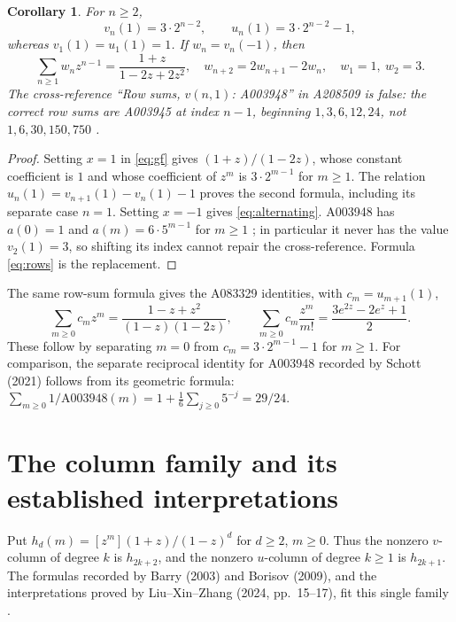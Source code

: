 \documentclass[11pt]{article}
\newtheorem{corollary}[theorem]{Corollary}
\begin{document}
\begin{corollary}\label{cor:rows}
For $n\geq2$,
\begin{equation}\label{eq:rows}
v_n(1)=3\cdot2^{n-2},\qquad u_n(1)=3\cdot2^{n-2}-1,
\end{equation}
whereas $v_1(1)=u_1(1)=1$. If $w_n=v_n(-1)$, then
\begin{equation}\label{eq:alternating}
\sum_{n\geq1}w_nz^{n-1}=\frac{1+z}{1-2z+2z^2},\quad
w_{n+2}=2w_{n+1}-2w_n,\quad w_1=1,\ w_2=3.
\end{equation}
The cross-reference ``Row sums, $v(n,1)$: A003948'' in A208509 is false:
the correct row sums are A003945 at index $n-1$, beginning $1,3,6,12,24$,
not $1,6,30,150,750$ \cite{a003945}.
\end{corollary}
\begin{proof}
Setting $x=1$ in \eqref{eq:gf} gives $(1+z)/(1-2z)$, whose constant
coefficient is $1$ and whose coefficient of $z^m$ is $3\cdot2^{m-1}$
for $m\geq1$. The relation $u_n(1)=v_{n+1}(1)-v_n(1)-1$
proves the second formula, including its separate case $n=1$.
Setting $x=-1$ gives \eqref{eq:alternating}. A003948 has
$a(0)=1$ and $a(m)=6\cdot5^{m-1}$ for $m\geq1$ \cite{a003948};
in particular it never has the value $v_2(1)=3$, so shifting its index
cannot repair the cross-reference. Formula \eqref{eq:rows} is the replacement.
\end{proof}
The same row-sum formula gives the A083329 identities, with $c_m=u_{m+1}(1)$,
\[
\sum_{m\geq0}c_mz^m=\frac{1-z+z^2}{(1-z)(1-2z)},\qquad
\sum_{m\geq0}c_m\frac{z^m}{m!}=\frac{3e^{2z}-2e^z+1}{2}.
\]
These follow by separating $m=0$ from $c_m=3\cdot2^{m-1}-1$ for $m\geq1$.
For comparison, the separate reciprocal identity for A003948 recorded by
Schott (2021) follows from its geometric formula:
$\sum_{m\geq0}1/\mathrm{A003948}(m)=1+\frac16\sum_{j\geq0}5^{-j}=29/24$.

\section{The column family and its established interpretations}
Put $h_d(m)=[z^m](1+z)/(1-z)^d$ for $d\geq2$, $m\geq0$.
Thus the nonzero $v$-column of degree $k$ is $h_{2k+2}$, and the nonzero
$u$-column of degree $k\geq1$ is $h_{2k+1}$.
The formulas recorded by Barry (2003) and Borisov (2009), and the
interpretations proved by Liu--Xin--Zhang (2024, pp.~15--17), fit this
single family \cite{columns,liu}.
\end{document}
